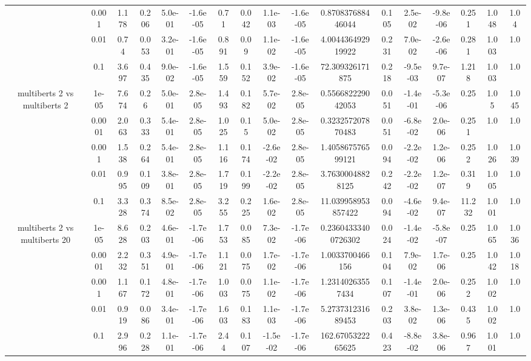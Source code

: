 \begin{tabular}{|c|c|c|c|c|c|c|c|c|c|c|c|c|c|c|c|c|}
 & 0.001 & 1.178 & 0.206 & 5.0e-01 & -1.6e-05 & 0.71 & 0.042 & 1.1e-03 & -1.6e-05 & 0.870837688446044 & 0.105 & 2.5e-02 & -9.8e-06 & 0.251 & 1.048 & 1.04 \\
 & 0.01 & 0.74 & 0.053 & 3.2e-01 & -1.6e-05 & 0.891 & 0.09 & 1.1e-02 & -1.6e-05 & 4.004436492919922 & 0.231 & 7.0e-02 & -2.6e-06 & 0.281 & 1.003 & 1.0 \\
 & 0.1 & 3.697 & 0.435 & 9.0e-02 & -1.6e-05 & 1.559 & 0.152 & 3.9e-02 & -1.6e-05 & 72.309326171875 & 0.218 & -9.5e-03 & 9.7e-07 & 1.218 & 1.003 & 1.0 \\
\hline
\multirow{5}{*}{multiberts 2 vs multiberts 2} & 1e-05 & 7.674 & 0.26 & 5.0e-01 & 2.8e-05 & 1.493 & 0.182 & 5.7e-02 & 2.8e-05 & 0.556682229042053 & 0.051 & -1.4e-01 & -5.3e-06 & 0.25 & 1.05 & 1.045 \\
 & 0.0001 & 2.063 & 0.333 & 5.4e-01 & 2.8e-05 & 1.025 & 0.15 & 5.0e-02 & 2.8e-05 & 0.323257207870483 & 0.051 & -6.8e-02 & 2.0e-06 & 0.251 & 1.0 & 1.0 \\
 & 0.001 & 1.538 & 0.264 & 5.4e-01 & 2.8e-05 & 1.116 & 0.174 & -2.6e-02 & 2.8e-05 & 1.405867576599121 & 0.094 & -2.2e-02 & 1.2e-06 & 0.252 & 1.026 & 1.039 \\
 & 0.01 & 0.995 & 0.109 & 3.8e-01 & 2.8e-05 & 1.719 & 0.199 & -2.2e-02 & 2.8e-05 & 3.76300048828125 & 0.242 & -2.2e-02 & 1.2e-07 & 0.319 & 1.005 & 1.0 \\
 & 0.1 & 3.328 & 0.374 & 8.5e-02 & 2.8e-05 & 3.255 & 0.225 & 1.6e-02 & 2.8e-05 & 11.039958953857422 & 0.094 & -4.6e-02 & 9.4e-07 & 11.232 & 1.001 & 1.0 \\
\hline
\multirow{5}{*}{multiberts 2 vs multiberts 20} & 1e-05 & 8.628 & 0.203 & 4.6e-01 & -1.7e-06 & 1.753 & 0.085 & 7.3e-02 & -1.7e-06 & 0.23604333400726302 & 0.024 & -1.4e-02 & -5.8e-07 & 0.25 & 1.065 & 1.036 \\
 & 0.0001 & 2.232 & 0.351 & 4.9e-01 & -1.7e-06 & 1.121 & 0.075 & 1.7e-02 & -1.7e-06 & 1.0033700466156 & 0.104 & 7.9e-02 & 1.7e-06 & 0.25 & 1.042 & 1.018 \\
 & 0.001 & 1.167 & 0.172 & 4.8e-01 & -1.7e-06 & 1.003 & 0.075 & 1.1e-02 & -1.7e-06 & 1.23140263557434 & 0.107 & -1.4e-01 & 2.0e-06 & 0.252 & 1.002 & 1.0 \\
 & 0.01 & 0.919 & 0.086 & 3.4e-01 & -1.7e-06 & 1.603 & 0.183 & 1.1e-03 & -1.7e-06 & 5.273731231689453 & 0.203 & 3.8e-02 & 1.3e-06 & 0.435 & 1.002 & 1.0 \\
 & 0.1 & 2.996 & 0.228 & 1.1e-01 & -1.7e-06 & 2.44 & 0.107 & -1.5e-02 & -1.7e-06 & 162.6705322265625 & 0.423 & -8.8e-02 & 3.8e-06 & 0.967 & 1.001 & 1.0 \\

\end{tabular}
